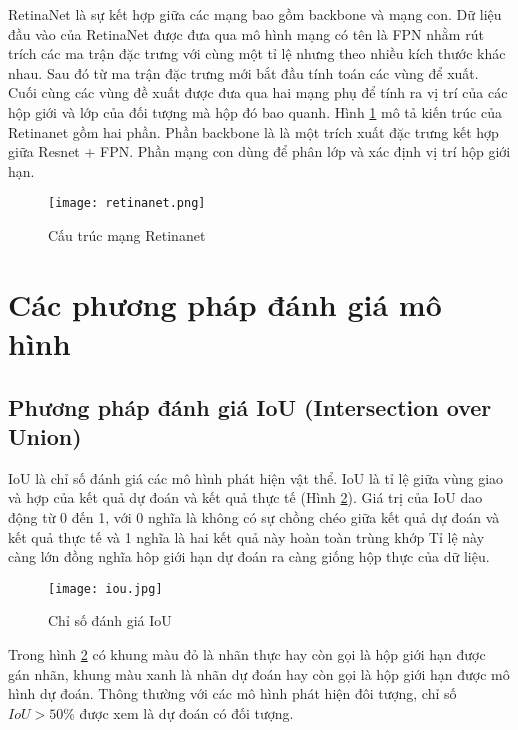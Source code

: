 \documentclass[../the.tex]{subfiles}
\begin{document}
\bigskip
{\fontsize{13}{12} \selectfont  

RetinaNet là sự kết hợp giữa các mạng bao gồm backbone và mạng con. Dữ 
liệu đầu vào của RetinaNet được đưa qua mô hình mạng có tên là FPN \cite{lin2017feature} nhằm rút trích các ma trận đặc trưng với 
cùng một tỉ lệ nhưng theo nhiều kích thước khác nhau. Sau đó từ ma trận đặc trưng mới bắt đầu tính toán các vùng để 
xuất. Cuối cùng các vùng đề xuất được đưa qua hai mạng phụ để tính ra vị trí của các hộp giới và lớp của đối 
tượng mà hộp đó bao quanh. Hình \ref{fig:retinanet} mô tả kiến trúc của Retinanet gồm hai phần. Phần backbone là
là một trích xuất đặc trưng kết hợp giữa Resnet + FPN. Phần mạng con dùng để phân lớp và 
xác định vị trí hộp giới hạn.
}

\begin{figure}[H]
	\centering
	\texttt{[image: retinanet.png]}
	\caption{Cấu trúc mạng Retinanet \cite{lin2018focal}}
	\label{fig:retinanet}
\end{figure}
\bigskip


\section{Các phương pháp đánh giá mô hình} 
\subsection{Phương pháp đánh giá IoU (Intersection over Union)}
{\fontsize{13}{12} \selectfont  
IoU là chỉ số đánh giá các mô hình phát hiện vật thể. IoU là tỉ lệ giữa vùng giao và hợp của kết quả dự đoán và kết quả thực tế (Hình \ref{fig:iou}). 
Giá trị của IoU dao động
từ 0 đến 1, với 0 nghĩa là không có sự chồng chéo giữa kết quả dự đoán và kết quả
thực tế và 1 nghĩa là hai kết quả này hoàn toàn trùng khớp
Tỉ lệ này càng lớn đồng nghĩa hôp giới hạn dự đoán ra càng giống hộp thực của dữ liệu.
}

\begin{figure}[H]
	\centering
	\texttt{[image: iou.jpg]}
	\caption{Chỉ số đánh giá IoU}
	\label{fig:iou}
\end{figure}
\bigskip

{\fontsize{13}{12} \selectfont  
Trong hình \ref{fig:iou} có khung màu đỏ là nhãn thực hay còn gọi là hộp giới hạn
được gán nhãn, khung màu xanh là nhãn dự đoán hay còn gọi là hộp giới hạn được mô hình dự đoán. Thông thường với các mô hình phát hiện đôi tượng, chỉ số $IoU > 50\%$ được xem là dự đoán có đối tượng. 
}
\end{document}
